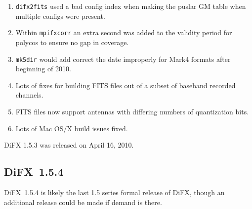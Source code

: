 \begin{enumerate}
\item {\tt difx2fits} used a bad config index when making the puslar GM table when multiple configs were present.
\item Within {\tt mpifxcorr} an extra second was added to the validity period for polycos to ensure no gap in coverage.
\item {\tt mk5dir} would add correct the date improperly for Mark4 formats after beginning of 2010.
\item Lots of fixes for building FITS files out of a subset of baseband recorded channels.
\item FITS files now support antennas with differing numbers of quantization bits.
\item Lots of Mac OS/X build issues fixed.
\end{enumerate}

DiFX 1.5.3 was released on April 16, 2010.

\subsection{DiFX~1.5.4}

DiFX~1.5.4 is likely the last 1.5 series formal release of DiFX, though an additional release could be made if demand is there.

